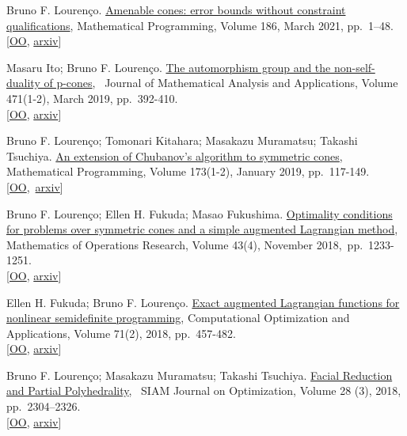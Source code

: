 Bruno F. Lourenço.
\href{https://link.springer.com/article/10.1007/s10107-019-01439-3}{Amenable
cones: error bounds without constraint qualifications}, Mathematical
Programming, Volume 186, March 2021, pp.~1--48.\\
{[}\href{http://www.optimization-online.org/DB_HTML/2017/11/6348.html}{OO},
\href{https://arxiv.org/abs/1712.06221}{arxiv}{]}

Masaru Ito; Bruno F. Lourenço.
\href{https://www.sciencedirect.com/science/article/pii/S0022247X18309107}{The
automorphism group and the non-self-duality of p-cones},~ Journal of
Mathematical Analysis and Applications, Volume 471(1-2), March 2019,
pp.~392-410.\\
{[}\href{http://www.optimization-online.org/DB_HTML/2018/06/6683.html}{OO},
\href{https://arxiv.org/abs/1808.01578}{arxiv}{]}

Bruno F. Lourenço; Tomonari Kitahara; Masakazu Muramatsu; Takashi
Tsuchiya.
\href{https://link.springer.com/article/10.1007/s10107-017-1207-7}{An
extension of Chubanov's algorithm to symmetric cones}, Mathematical
Programming, Volume 173(1-2), January 2019, pp.~117-149.\\
{[}\href{http://www.optimization-online.org/DB_HTML/2016/12/5790.html}{OO},~\href{https://arxiv.org/abs/1702.01421}{arxiv}{]}

Bruno F. Lourenço; Ellen H. Fukuda; Masao Fukushima.
\href{https://pubsonline.informs.org/doi/abs/10.1287/moor.2017.0901}{Optimality
conditions for problems over symmetric cones and a simple augmented
Lagrangian method}, Mathematics of Operations Research, Volume 43(4),
November 2018,~pp.~1233-1251.\\
{[}\href{http://www.optimization-online.org/DB_HTML/2016/12/5785.html}{OO},
\href{https://arxiv.org/abs/1701.05298}{arxiv}{]}

Ellen H. Fukuda; Bruno F. Lourenço.
\href{https://link.springer.com/article/10.1007\%2Fs10589-018-0017-z}{Exact
augmented Lagrangian functions for nonlinear semidefinite programming},
Computational Optimization and Applications, Volume 71(2), 2018,
pp.~457-482.\\
{[}\href{http://www.optimization-online.org/DB_HTML/2017/05/6016.html}{OO},
\href{https://arxiv.org/abs/1705.06551}{arxiv}{]}

Bruno F. Lourenço; Masakazu Muramatsu; Takashi Tsuchiya.
\href{https://epubs.siam.org/doi/abs/10.1137/15M1051634}{Facial
Reduction and Partial Polyhedrality},~ SIAM Journal on Optimization,
Volume 28 (3), 2018, pp.~2304--2326.\\
{[}\href{http://www.optimization-online.org/DB_HTML/2015/11/5224.html}{OO},
\href{https://arxiv.org/abs/1512.02549}{arxiv}{]}

